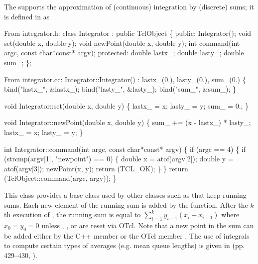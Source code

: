 The  
supports the approximation of (continuous) integration by (discrete)
sums; it is defined in  as
\begin{program}
{\rm From integrator.h:}
        class Integrator : public TclObject \{
        public:
                Integrator();
                void set(double x, double y);
                void newPoint(double x, double y);
                int command(int argc, const char*const* argv);
        protected:
                double lastx_;
                double lasty_;
                double sum_;
        \};

{\rm From integrator.cc:}
        Integrator::Integrator() : lastx_(0.), lasty_(0.), sum_(0.)
        \{
                bind("lastx_", &lastx_);
                bind("lasty_", &lasty_);
                bind("sum_", &sum_);
        \}

        void Integrator::set(double x, double y)
        \{
                lastx_ = x;
                lasty_ = y;
                sum_ = 0.;
        \}

        void Integrator::newPoint(double x, double y)
        \{
                sum_ += (x - lastx_) * lasty_;
                lastx_ = x;
                lasty_ = y;
        \}

        int Integrator::command(int argc, const char*const* argv)
        \{
                if (argc == 4) \{
                        if (strcmp(argv[1], "newpoint") == 0) \{
                                double x = atof(argv[2]);
                                double y = atof(argv[3]);
                                newPoint(x, y);
                                return (TCL_OK);
                        \}
                \}
                return (TclObject::command(argc, argv));
        \}
\end{program}
This class provides a base class used by other classes such
as  that keep running sums.
Each new element of the running sum is added by
the  function.
After the $k$th execution of , the running sum
is equal to $\sum_{i=1}^{k}y_{i-1}(x_i - x_{i-1})$ where
$x_0 = y_0 = 0$ unless , , or 
are reset via OTcl.
Note that a new point in the sum can be added either by the
C++ member  or the OTcl member .
The use of integrals to compute certain types of averages
(e.g. mean queue lengths) is given in (pp. 429--430, \cite{Jain91:Art}).

